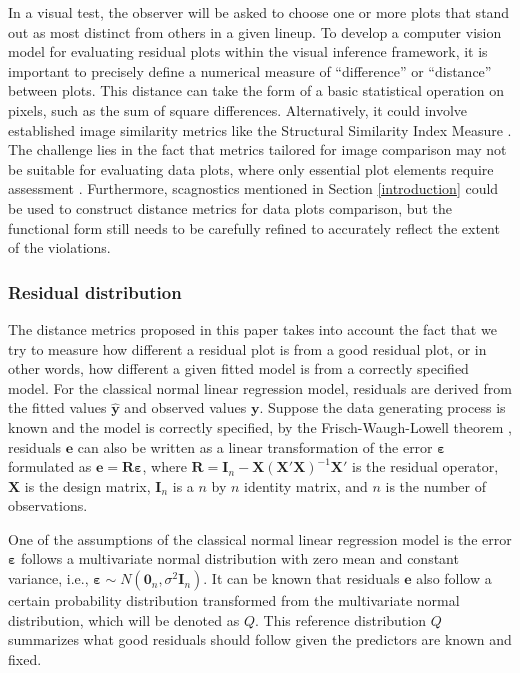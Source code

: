 \documentclass[]{interact}
\theoremstyle{plain}%
\theoremstyle{definition}
\theoremstyle{remark}
\begin{document}
In a visual test, the observer will be asked to choose one or more plots
that stand out as most distinct from others in a given lineup. To
develop a computer vision model for evaluating residual plots within the
visual inference framework, it is important to precisely define a
numerical measure of ``difference'' or ``distance'' between plots. This
distance can take the form of a basic statistical operation on pixels,
such as the sum of square differences. Alternatively, it could involve
established image similarity metrics like the Structural Similarity
Index Measure \citep{wang2004image}. The challenge lies in the fact that
metrics tailored for image comparison may not be suitable for evaluating
data plots, where only essential plot elements require assessment
\citep{chowdhury2018measuring}. Furthermore, scagnostics mentioned in
Section \ref{introduction} could be used to construct distance metrics
for data plots comparison, but the functional form still needs to be
carefully refined to accurately reflect the extent of the violations.

\hypertarget{residual-distribution}{%
\subsubsection{Residual distribution}\label{residual-distribution}}

The distance metrics proposed in this paper takes into account the fact
that we try to measure how different a residual plot is from a good
residual plot, or in other words, how different a given fitted model is
from a correctly specified model. For the classical normal linear
regression model, residuals are derived from the fitted values
\(\hat{\boldsymbol{y}}\) and observed values \(\boldsymbol{y}\). Suppose
the data generating process is known and the model is correctly
specified, by the Frisch-Waugh-Lowell theorem \citep{frisch1933partial},
residuals \(\boldsymbol{e}\) can also be written as a linear
transformation of the error \(\boldsymbol{\varepsilon}\) formulated as
\(\boldsymbol{e} = \boldsymbol{R}\boldsymbol{\varepsilon}\), where
\(\boldsymbol{R}=\boldsymbol{I}_n -\boldsymbol{X}(\boldsymbol{X}'\boldsymbol{X})^{-1}\boldsymbol{X}'\)
is the residual operator, \(\boldsymbol{X}\) is the design matrix,
\(\boldsymbol{I}_n\) is a \(n\) by \(n\) identity matrix, and \(n\) is
the number of observations.

One of the assumptions of the classical normal linear regression model
is the error \(\boldsymbol{\varepsilon}\) follows a multivariate normal
distribution with zero mean and constant variance, i.e.,
\(\boldsymbol{\varepsilon} \sim N(\boldsymbol{0}_n,\sigma^2\boldsymbol{I}_n)\).
It can be known that residuals \(\boldsymbol{e}\) also follow a certain
probability distribution transformed from the multivariate normal
distribution, which will be denoted as \(Q\). This reference
distribution \(Q\) summarizes what good residuals should follow given
the predictors are known and fixed.
\end{document}
